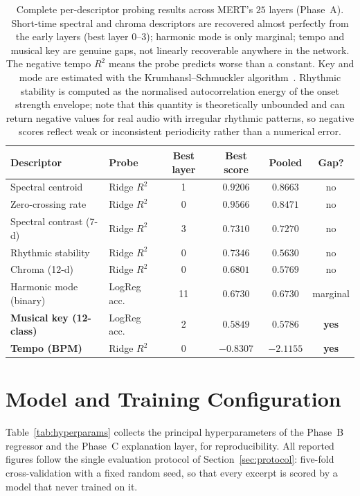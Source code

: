 \documentclass[12pt]{report}
\begin{document}
\begin{table}[ht]
\centering
\small
\begin{tabular}{l l c c c c}
\toprule
\textbf{Descriptor} & \textbf{Probe} & \textbf{Best layer} & \textbf{Best score} & \textbf{Pooled} & \textbf{Gap?} \\
\midrule
Spectral centroid        & Ridge $R^{2}$ & 1  & $0.9206$  & $0.8663$  & no \\
Zero-crossing rate       & Ridge $R^{2}$ & 0  & $0.9566$  & $0.8471$  & no \\
Spectral contrast (7-d)  & Ridge $R^{2}$ & 3  & $0.7310$  & $0.7270$  & no \\
Rhythmic stability       & Ridge $R^{2}$ & 0  & $0.7346$  & $0.5630$  & no \\
Chroma (12-d)            & Ridge $R^{2}$ & 0  & $0.6801$  & $0.5769$  & no \\
Harmonic mode (binary)   & LogReg acc.   & 11 & $0.6730$  & $0.6730$  & marginal \\
\textbf{Musical key (12-class)} & LogReg acc. & 2 & $\mathbf{0.5849}$ & $0.5786$ & \textbf{yes} \\
\textbf{Tempo (BPM)}     & Ridge $R^{2}$ & 0  & $\mathbf{-0.8307}$ & $-2.1155$ & \textbf{yes} \\
\bottomrule
\end{tabular}
\caption{Complete per-descriptor probing results across MERT's $25$ layers (Phase~A). Short-time spectral and chroma descriptors are recovered almost perfectly from the early layers (best layer $0$--$3$); harmonic mode is only marginal; tempo and musical key are genuine gaps, not linearly recoverable anywhere in the network. The negative tempo $R^{2}$ means the probe predicts worse than a constant. Key and mode are estimated with the Krumhansl--Schmuckler algorithm~\cite{krumhansl_kessler_1982}. Rhythmic stability is computed as the normalised autocorrelation energy of the onset strength envelope; note that this quantity is theoretically unbounded and can return negative values for real audio with irregular rhythmic patterns, so negative scores reflect weak or inconsistent periodicity rather than a numerical error.}
\label{tab:probing-full}
\end{table}

\chapter{Model and Training Configuration}
\label{app:config}

Table~\ref{tab:hyperparams} collects the principal hyperparameters of the Phase~B regressor and the Phase~C explanation layer, for reproducibility. All reported figures follow the single evaluation protocol of Section~\ref{sec:protocol}: five-fold cross-validation with a fixed random seed, so that every excerpt is scored by a model that never trained on it.
\end{document}
